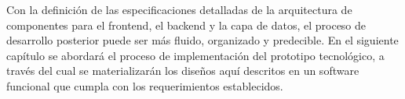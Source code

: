 Con la definición de las especificaciones detalladas de la arquitectura de componentes para el frontend, el backend y la capa de datos, el proceso de desarrollo posterior puede ser más fluido, organizado y predecible. En el siguiente capítulo se abordará el proceso de implementación del prototipo tecnológico, a través del cual se materializarán los diseños aquí descritos en un software funcional que cumpla con los requerimientos establecidos.
